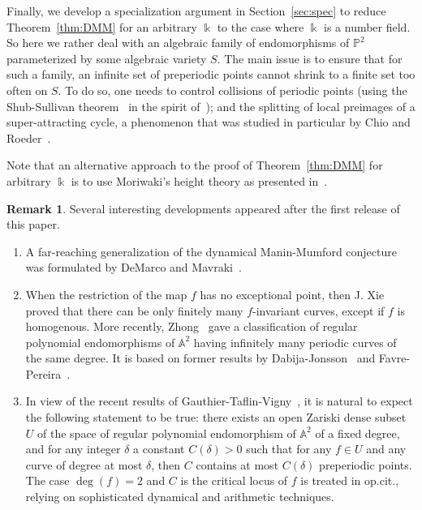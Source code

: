 \documentclass[11 pt, oneside, a4paper]{amsart}
\renewcommand{\P}{\mathbb{P}}
\newcommand{\nA}{\mathbb{A}}
\newcommand{\nk}{\Bbbk}
\theoremstyle{definition}
\newtheorem{rmk-intro}{Remark}
\theoremstyle{definition}
\begin{document}
 
Finally, we develop a specialization argument in Section~\ref{sec:spec} to reduce Theorem~\ref{thm:DMM} for an arbitrary $\nk$
 to the case where $\nk$ is a number field.  So here we rather deal with an algebraic family of 
endomorphisms of $\P^2$ parameterized by some
algebraic variety $S$. 
The main issue is to ensure that for such a family, an infinite set of preperiodic points cannot shrink to a finite set 
 too often on  $S$. To do so, one needs
to control collisions of periodic points (using the 
Shub-Sullivan  theorem~\cite{shub-sullivan} in the spirit of~\cite{DMM-henon}); 
and the splitting of local preimages of a super-attracting cycle, 
a phenomenon that was studied in particular by Chio and Roeder~\cite{chio-roeder}.

{Note that 
an alternative approach to  the proof of Theorem~\ref{thm:DMM} for   arbitrary $\nk$ is to use  Moriwaki's  height theory as presented in~\cite{zbMATH07150972}.} 

\begin{rmk-intro}
{Several interesting developments appeared after the first release of this paper. 
\begin{enumerate}
\item A far-reaching generalization of the dynamical Manin-Mumford conjecture was formulated by DeMarco and Mavraki~\cite{DeMarco-Mavraki:DMM}.
\item  When the restriction of the map $f$ has no exceptional point, then J. Xie~~\cite[Theorem~1.20]{MR4711366} 
proved that there can be only finitely many $f$-invariant curves, except if $f$ is homogenous. More recently, Zhong~\cite[\S~7]{arXiv:2508.13873} gave 
a  classification of regular polynomial endomorphisms of $\nA^2$ having infinitely many periodic curves of the same degree.
It is based on former results by Dabija-Jonsson~\cite{MR2384901} and 
Favre-Pereira~\cite{MR3421725}. 
\item In view of the recent results of Gauthier-Taflin-Vigny~\cite[Theorem~D]{gauthier-taflin-vigny:sparsity}, it is natural to expect the following statement to be true: 
there exists an open Zariski dense subset $U$ of the space of regular polynomial endomorphism of $\nA^2$ of a fixed degree, and for any integer $\delta$ a constant $C(\delta)>0$ such that 
for any $f\in U$ and any curve of degree at most $\delta$, then $C$ contains at most $C(\delta)$ preperiodic points.
 The case $\deg(f)=2$ and $C$ is the critical locus of $f$ is treated in op.cit., relying on 
  sophisticated dynamical and arithmetic  techniques.
\end{enumerate}
}
\end{rmk-intro}
\end{document}

